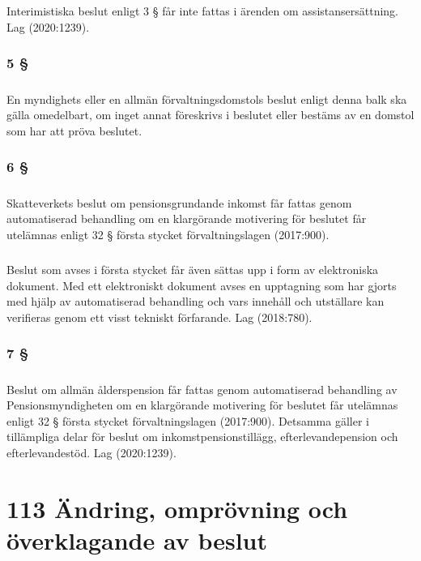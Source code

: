 \documentclass[a4paper,notitlepage,openany,10pt]{book}
\begin{document}
\paragraph*{}
Interimistiska beslut enligt 3 § får inte fattas i ärenden om assistansersättning.
Lag (2020:1239).
\subsection*{5 §}
\paragraph*{}
En myndighets eller en allmän förvaltningsdomstols beslut enligt denna balk ska gälla omedelbart, om inget annat föreskrivs i beslutet eller bestäms av en domstol som har att pröva beslutet.
\subsection*{6 §}
\paragraph*{}
Skatteverkets beslut om pensionsgrundande inkomst får fattas genom automatiserad behandling om en klargörande motivering för beslutet får utelämnas enligt 32 § första stycket förvaltningslagen (2017:900).
\paragraph*{}
Beslut som avses i första stycket får även sättas upp i form av elektroniska dokument. Med ett elektroniskt dokument avses en upptagning som har gjorts med hjälp av automatiserad behandling och vars innehåll och utställare kan verifieras genom ett visst tekniskt förfarande.
Lag (2018:780).
\subsection*{7 §}
\paragraph*{}
Beslut om allmän ålderspension får fattas genom automatiserad behandling av Pensionsmyndigheten om en klargörande motivering för beslutet får utelämnas enligt 32 § första stycket förvaltningslagen (2017:900). Detsamma gäller i tillämpliga delar för beslut om inkomstpensionstillägg, efterlevandepension och efterlevandestöd.
Lag (2020:1239).
\chapter*{113 Ändring, omprövning och överklagande av beslut}
\end{document}
